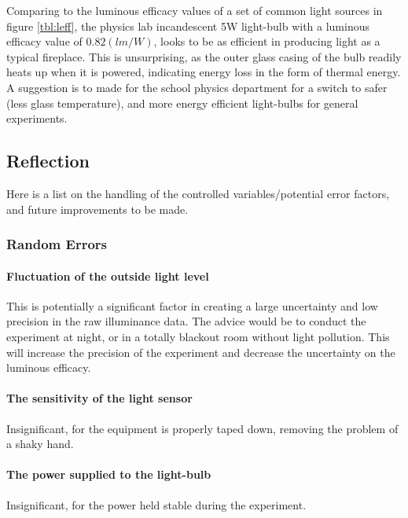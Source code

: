 \documentclass[a4paper,12pt]{article}
\begin{document}


Comparing to the luminous efficacy values of a set of common light sources in figure \ref{tbl:leff}, the physics lab incandescent 5W light-bulb with a luminous efficacy value of $0.82 (\si{lm\per W})$, looks to be as efficient in producing light as a typical fireplace. This is unsurprising, as the outer glass casing of the bulb readily heats up when it is powered, indicating energy loss in the form of thermal energy. A suggestion is to made for the school physics department for a switch to safer (less glass temperature), and more energy efficient light-bulbs for general experiments.

\subsection{Reflection}

Here is a list on the handling of the controlled variables/potential error factors, and future improvements to be made.

\subsubsection{Random Errors}
\paragraph{Fluctuation of the outside light level} This is potentially a significant factor in creating a large uncertainty and low precision in the raw illuminance data. The advice would be to conduct the experiment at night, or in a totally blackout room without light pollution. This will increase the precision of the experiment and decrease the uncertainty on the luminous efficacy.

\paragraph{The sensitivity of the light sensor} Insignificant, for the equipment is properly taped down, removing the problem of a shaky hand.

\paragraph{The power supplied to the light-bulb}
Insignificant, for the power held stable during the experiment.
\end{document}

